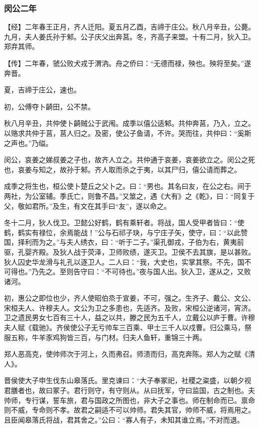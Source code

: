 \documentclass[]{article}
\begin{document}
\hypertarget{header-n626}{%
\subsubsection{闵公二年}\label{header-n626}}

【经】二年春王正月，齐人迁阳。夏五月乙酉，吉禘于庄公。秋八月辛丑，公薨。九月，夫人姜氏孙于邾。公子庆父出奔莒。冬，齐高子来盟。十有二月，狄入卫。郑弃其师。

【传】二年春，虢公败犬戎于渭汭。舟之侨曰：``无德而禄，殃也。殃将至矣。''遂奔晋。

夏，吉禘于庄公，速也。

初，公傅夺卜齮田，公不禁。

秋八月辛丑，共仲使卜齮贼公于武闱。成季以僖公适邾。共仲奔莒，乃入，立之。以赂求共仲于莒，莒人归之。及密，使公子鱼请，不许。哭而往，共仲曰：``奚斯之声也。''乃缢。

闵公，哀姜之娣叔姜之子也，故齐人立之。共仲通于哀姜，哀姜欲立之。闵公之死也，哀姜与知之，故孙于邾。齐人取而杀之于夷，以其尸归，僖公请而葬之。

成季之将生也，桓公使卜楚丘之父卜之。曰：``男也。其名曰友，在公之右。间于两社，为公室辅。季氏亡，则鲁不昌。''又筮之，遇《大有》之《乾》，曰：``同复于父，敬如君所。''及生，有文在其手曰``友''，遂以命之。

冬十二月，狄人伐卫。卫懿公好鹤，鹤有乘轩者。将战，国人受甲者皆曰：``使鹤，鹤实有禄位，余焉能战！''公与石祁子玦，与宁庄子矢，使守，曰：``以此赞国，择利而为之。''与夫人绣衣，曰：``听于二子。''渠孔御戎，子伯为右，黄夷前驱，孔婴齐殿。及狄人战于荧泽，卫师败绩，遂灭卫。卫侯不去其旗，是以甚败。狄人囚史华龙滑与礼孔以逐卫人。二人曰：``我，大史也，实掌其祭。不先，国不可得也。''乃先之。至则告守曰：``不可待也。''夜与国人出。狄入卫，遂从之，又败诸河。

初，惠公之即位也少，齐人使昭伯烝于宣姜，不可，强之。生齐子、戴公、文公、宋桓夫人、许穆夫人。文公为卫之多患也，先适齐。及败，宋桓公逆诸河，宵济。卫之遗民男女七百有三十人，益之以共，滕之民为五千人，立戴公以庐于曹。许穆夫人赋《载驰》。齐侯使公子无亏帅车三百乘、甲士三千人以戍曹。归公乘马，祭服五称，牛羊豕鸡狗皆三百，与门材。归夫人鱼轩，重锦三十两。

郑人恶高克，使帅师次于河上，久而弗召。师溃而归，高克奔陈。郑人为之赋《清人》。

晋侯使大子申生伐东山皋落氏。里克谏曰：``大子奉冢祀，社稷之粢盛，以朝夕视君膳者也，故曰冢子。君行则守，有守则从。从曰抚军，守曰监国，古之制也。夫帅师，专行谋，誓车旅，君与国政之所图也，非大子之事也。师在制命而已。禀命则不威，专命则不孝。故君之嗣适不可以帅师。君失其官，帅师不威，将焉用之。且臣闻皋落氏将战，君其舍之。''公曰：``寡人有子，未知其谁立焉。''不对而退。
\end{document}
